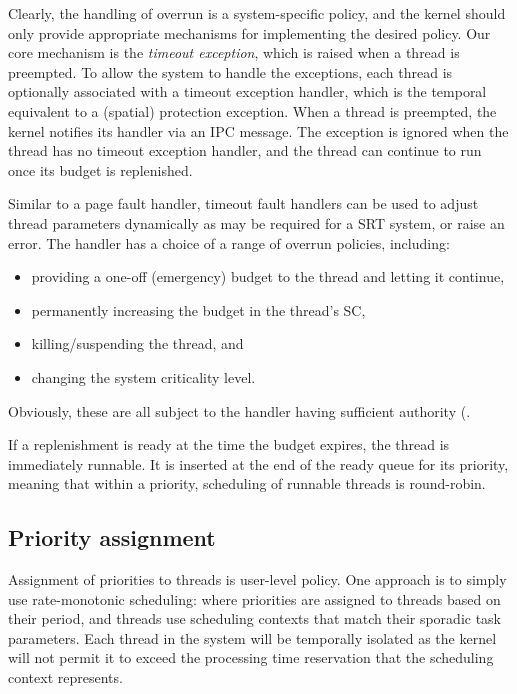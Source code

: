 Clearly, the handling of overrun is a system-specific policy, and the
kernel should only provide appropriate
mechanisms for implementing the desired policy. Our core mechanism is
the \emph{timeout exception}, which is raised when a thread is
preempted. To allow the system to handle the exceptions, each thread
is optionally associated with a timeout exception handler, which is
the temporal equivalent to a (spatial) protection exception. When a
thread is preempted, the kernel notifies its handler via an IPC message. The
exception is ignored when the thread has no timeout exception handler, and the thread
can continue to run once its budget is replenished.

Similar to a page fault handler, timeout fault handlers can be used to adjust thread parameters dynamically as may be required for a \gls{SRT} system, or raise an error.
The handler has a choice of a range of overrun policies, including:
\begin{itemize}
      \item providing a one-off (emergency) budget to the thread and letting it continue,
       \item permanently increasing the budget in the thread's SC,
       \item killing/suspending the thread, and
       \item changing the system criticality level.
       \end{itemize}
Obviously, these are all subject to the handler having sufficient
authority (\eg {}.

If a replenishment is ready at the time the budget expires, the thread
is immediately runnable. It is inserted at the end of the ready queue
for its priority, meaning that within a priority, scheduling of
runnable threads is round-robin.

\subsection{Priority assignment}

Assignment of priorities to threads is user-level policy. One approach is to simply use
rate-monotonic scheduling: where priorities are assigned to threads based on their period, and
threads use scheduling contexts that match their sporadic task parameters.  Each thread in the
system will be temporally isolated as the kernel will not permit it to exceed the processing time
reservation that the scheduling context represents.

